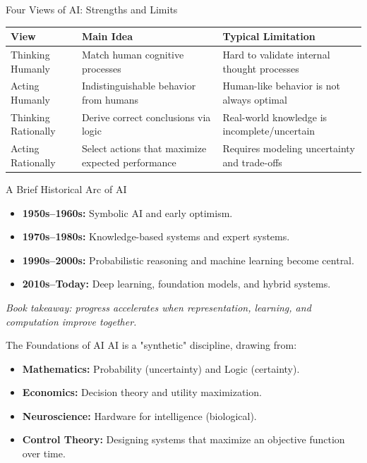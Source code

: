 \documentclass[10pt]{beamer}
\begin{document}
\begin{frame}{Four Views of AI: Strengths and Limits}
    \footnotesize
    \setlength{\tabcolsep}{4pt}
    \renewcommand{\arraystretch}{1.15}
    \begin{tabularx}{\textwidth}{>{\raggedright\arraybackslash}p{2.7cm} >{\raggedright\arraybackslash}X >{\raggedright\arraybackslash}X}
        \toprule
        \textbf{View} & \textbf{Main Idea} & \textbf{Typical Limitation} \\
        \midrule
        Thinking Humanly & Match human cognitive processes & Hard to validate internal thought processes \\
        Acting Humanly & Indistinguishable behavior from humans & Human-like behavior is not always optimal \\
        Thinking Rationally & Derive correct conclusions via logic & Real-world knowledge is incomplete/uncertain \\
        Acting Rationally & Select actions that maximize expected performance & Requires modeling uncertainty and trade-offs \\
        \bottomrule
    \end{tabularx}
\end{frame}

\begin{frame}{A Brief Historical Arc of AI}
    \begin{itemize}
        \item \textbf{1950s--1960s:} Symbolic AI and early optimism.
        \item \textbf{1970s--1980s:} Knowledge-based systems and expert systems.
        \item \textbf{1990s--2000s:} Probabilistic reasoning and machine learning become central.
        \item \textbf{2010s--Today:} Deep learning, foundation models, and hybrid systems.
    \end{itemize}
    \vspace{0.3cm}
    \textit{Book takeaway: progress accelerates when representation, learning, and computation improve together.}
\end{frame}

\begin{frame}{The Foundations of AI}
    AI is a "synthetic" discipline, drawing from:
    \begin{itemize}
        \item \textbf{Mathematics:} Probability (uncertainty) and Logic (certainty).
        \item \textbf{Economics:} Decision theory and utility maximization.
        \item \textbf{Neuroscience:} Hardware for intelligence (biological).
        \item \textbf{Control Theory:} Designing systems that maximize an objective function over time.
    \end{itemize}
\end{frame}
\end{document}
